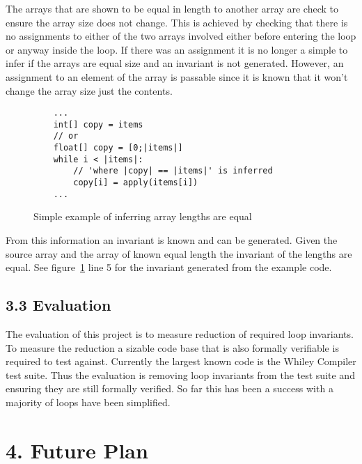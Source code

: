\documentclass[11pt, a4paper, twoside, openright]{report}
\begin{document}
The arrays that are shown to be equal in length to another array are
check to ensure the array size does not change.
This is achieved by checking that there is no assignments to either
of the two arrays involved either before entering the loop or
anyway inside the loop.
If there was an assignment it is no longer a simple to infer if
the arrays are equal size and an invariant is not generated.
However, an assignment to an element of the array is passable since it
is known that it won't change the array size just the contents.

\begin{figure}[h]
\begin{lstlisting}
    ...
    int[] copy = items
    // or
    float[] copy = [0;|items|]
    while i < |items|:
        // 'where |copy| == |items|' is inferred
        copy[i] = apply(items[i])
    ...
\end{lstlisting}
\caption{Simple example of inferring array lengths are equal}
\label{lst:whiley-length}
\end{figure}

From this information an invariant is known and can be generated.
Given the source array and the array of known equal length the
invariant of the lengths are equal.
See figure~\ref{lst:whiley-length} line 5 for the invariant generated
from the example code.

\subsection*{3.3 Evaluation}

The evaluation of this project is to measure reduction of required loop
invariants. 
To measure the reduction a sizable code base that is also formally verifiable
is required to test against.
Currently the largest known code is the Whiley Compiler test suite.
Thus the evaluation is removing loop invariants from the test suite and
ensuring they are still formally verified.
So far this has been a success with a majority of loops have been simplified.

\section*{4. Future Plan}
\end{document}
